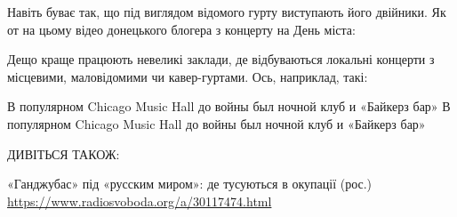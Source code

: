 Навіть буває так, що під виглядом відомого гурту виступають його двійники.
Як от на цьому відео донецького блогера з концерту на День міста:

Дещо краще працюють невеликі заклади, де відбуваються локальні концерти з
місцевими, маловідомими чи кавер-гуртами. Ось, наприклад, такі:

В популярном Chicago Music Hall до войны был ночной клуб и «Байкерз бар» В
популярном Chicago Music Hall до войны был ночной клуб и «Байкерз бар»

ДИВІТЬСЯ ТАКОЖ:

«Ганджубас» під «русским миром»: де тусуються в окупації (рос.)
\url{https://www.radiosvoboda.org/a/30117474.html}

